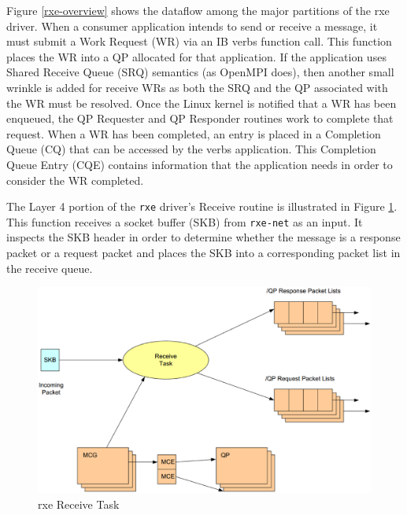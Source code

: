 \documentclass[11pt]{book}
\begin{document}
Figure \ref{rxe-overview} shows the dataflow among the major partitions of the rxe driver.
When a consumer application intends to send or receive a message, it must submit a Work
Request (WR) via an IB verbs function call.  This function places the WR into a QP
allocated for that application.  If the application uses Shared Receive Queue (SRQ)
semantics (as OpenMPI does), then another small wrinkle is added for receive WRs as both
the SRQ and the QP associated with the WR must be resolved.  Once the Linux kernel is
notified that a WR has been enqueued, the QP Requester and QP Responder routines work to
complete that request.  When a WR has been completed, an entry is placed in a Completion
Queue (CQ) that can be accessed by the verbs application.  This Completion Queue Entry
(CQE) contains information that the application needs in order to consider the WR
completed.

The Layer 4 portion of the \verb;rxe; driver's Receive routine is illustrated in Figure
\ref{rxe-recv}.  This function receives a socket buffer (SKB) from \verb;rxe-net; as an
input.  It inspects the SKB header in order to determine whether the message is a response
packet or a request packet and places the SKB into a corresponding packet list in the
receive queue.

\begin{figure}[!t]
\includegraphics[width=\textwidth]{rxe_recv}
\caption{rxe Receive Task \protect\cite{pearson-10}}\label{rxe-recv}
\end{figure}
\end{document}
